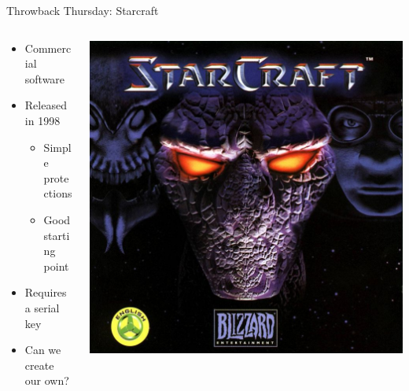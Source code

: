 \documentclass[10pt, compress, aspectratio=169]{beamer}
\begin{document}
\begin{frame}{Throwback Thursday: Starcraft}


	\begin{columns}
		\begin{column}{0.5\textwidth}
			\begin{itemize}
			\item Commercial software
			\item Released in 1998
			\begin{itemize}
				\item Simple protections
				\item Good starting point
			\end{itemize}
			\item Requires a serial key
			\item Can we create our own?
		\end{itemize}
		\end{column}
		\begin{column}{0.5\textwidth}
			\includegraphics[width=\textwidth]{images/starcraft.jpg}
		\end{column}
	\end{columns}

	
\end{frame}
\end{document}
